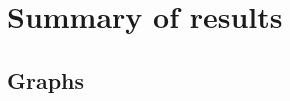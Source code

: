 \documentclass[thesis=M,english]{FITthesis}[2018/05/30]
\begin{document}

	
\section{Summary of results}
\subsection{Graphs}
%	
\end{document}
